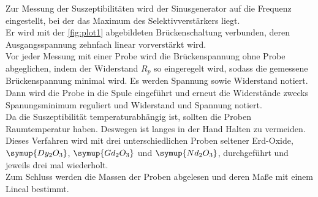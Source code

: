 Zur Messung der Suszeptibilitäten wird der Sinusgenerator auf die Frequenz
eingestellt, bei der das Maximum des Selektivverstärkers liegt.\\
Er wird mit der \autoref{fig:plot1} abgebildeten Brückenschaltung verbunden, deren Ausgangsspannung zehnfach linear vorverstärkt 
wird. \\
Vor jeder Messung mit einer Probe wird die Brückenspannung ohne Probe abgeglichen, 
indem der Widerstand $R_p$ so eingeregelt wird, sodass die gemessene Brückenspannung minimal wird.
Es werden Spannung sowie Widerstand notiert. \\
Dann wird die Probe in die Spule eingeführt und erneut die Widerstände zwecks Spanungsminimum reguliert und 
Widerstand und Spannung notiert.\\
Da die Suszeptibilität temperaturabhängig ist, sollten die Proben Raumtemperatur haben. Deswegen ist langes in der Hand Halten zu vermeiden.\\

Dieses Verfahren wird mit drei unterschiedlichen Proben seltener Erd-Oxide, $\symup{Dy_2O_3}$, $\symup{Gd_2O_3}$ und $\symup{Nd_2O_3}$, durchgeführt und jeweils drei mal wiederholt.\\
Zum Schluss werden die Massen der Proben abgelesen und deren Maße mit einem Lineal bestimmt.\\
